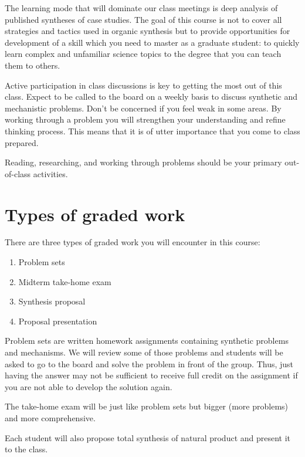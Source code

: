 The learning mode that will dominate our class meetings is deep analysis
of published syntheses of case studies. The goal of this course is not
to cover all strategies and tactics used in organic synthesis but to
provide opportunities for development of a skill which you need to
master as a graduate student: to quickly learn complex and unfamiliar
science topics to the degree that you can teach them to others.

Active participation in class discussions is key to getting the most out
of this class. Expect to be called to the board on a weekly basis to
discuss synthetic and mechanistic problems. Don't be concerned if you
feel weak in some areas. By working through a problem you will
strengthen your understanding and refine thinking process. This means
that it is of utter importance that you come to class prepared.

Reading, researching, and working through problems should be your
primary out-of-class activities.

\hypertarget{types-of-graded-work}{%
\section{Types of graded work}\label{types-of-graded-work}}

There are three types of graded work you will encounter in this course:

\begin{enumerate}
\def\labelenumi{\arabic{enumi}.}
\tightlist
\item
  Problem sets
\item
  Midterm take-home exam
\item
  Synthesis proposal
\item
  Proposal presentation
\end{enumerate}

Problem sets are written homework assignments containing synthetic
problems and mechanisms. We will review some of those problems and
students will be asked to go to the board and solve the problem in front
of the group. Thus, just having the answer may not be sufficient to
receive full credit on the assignment if you are not able to develop the
solution again.

The take-home exam will be just like problem sets but bigger (more
problems) and more comprehensive.

Each student will also propose total synthesis of natural product and
present it to the class.

